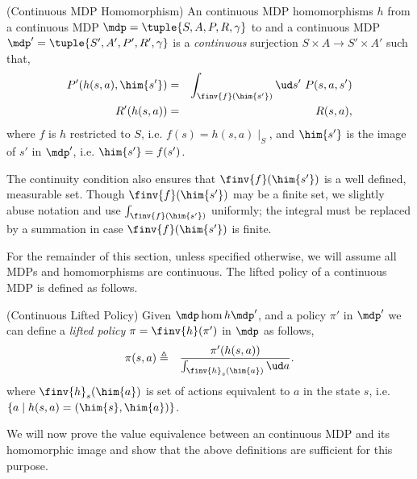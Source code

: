 \begin{definition}(Continuous MDP Homomorphism)
  An continuous MDP homomorphisms $h$ from a continuous MDP $\mdp
  = \tuple{S,A,P,R,\gamma}$ to and a continuous MDP $\mdp'
  = \tuple{S',A',P',R',\gamma}$ is a {\em continuous} surjection $S \times
  A \to S' \times A'$ such that,
  \begin{eqnarray}
    P'(h(s,a),\him{s'}) &=& \int_{\finv{f}(\him{s'})} \ud s' ~ P( s, a, s' ) \label{condition:chom-P} \\
    R'(h(s,a)) &=& R(s,a)  \label{condition:chom-R}, 
  \end{eqnarray}
  \noindent
  where $f$ is $h$ restricted to $S$, i.e. $f(s) = h(s,a)\mid_S$, and
  $\him{s'}$ is the image of $s'$ in $\mdp'$, i.e. $\him{s'} = f(s')$.
\end{definition}

The continuity condition also ensures that $\finv{f}(\him{s'})$ is
a well defined, measurable set. Though $\finv{f}(\him{s'})$ may be
a finite set, we slightly abuse notation and use
$\int_{\finv{f}(\him{s'})}$ uniformly; the integral must be replaced
by a summation in case $\finv{f}(\him{s'})$ is finite.

For the remainder of this section, unless specified otherwise, we will
assume all MDPs and homomorphisms are continuous. The lifted policy of
a continuous MDP is defined as follows.

\begin{definition}(Continuous Lifted Policy)
  Given $\mdp \hom{h} \mdp'$, and a policy $\pi'$ in $\mdp'$ we can
  define a {\em lifted policy} $\pi = \finv{h}(\pi')$ in $\mdp$ as
  follows,
  \begin{eqnarray}
    \pi(s,a) &\triangleq& \frac{\pi'(h(s,a))}{ \int_{\finv{h}_s(\him{a})} \ud a }.
  \end{eqnarray}
  \noindent
  where $\finv{h}_s(\him{a})$ is set of actions equivalent to $a$ in the
  state $s$, i.e. $\{ a \mid h(s,a) = (\him{s},\him{a}) \}$. 
\end{definition}

We will now prove the value equivalence between an continuous MDP and
its homomorphic image and show that the above definitions are sufficient
for this purpose.

